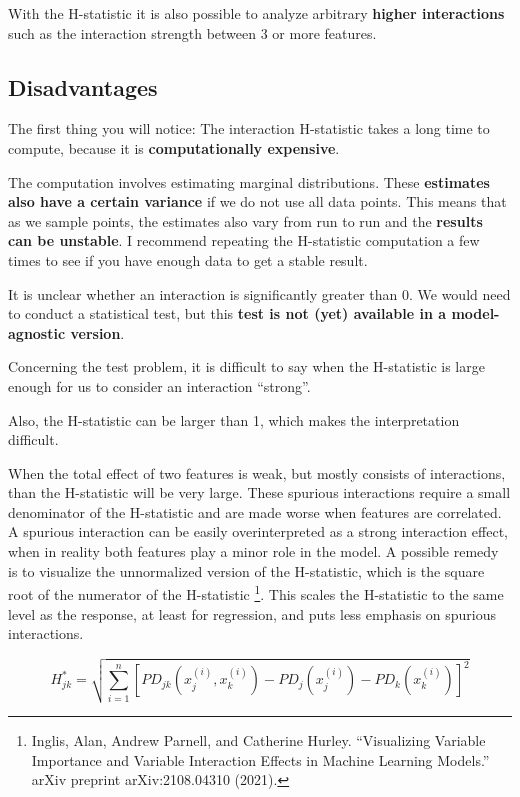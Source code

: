 \documentclass[
  11pt,
]{scrbook}
\begin{document}
With the H-statistic it is also possible to analyze arbitrary \textbf{higher interactions} such as the interaction strength between 3 or more features.

\hypertarget{disadvantages-7}{%
\subsection{Disadvantages}\label{disadvantages-7}}

The first thing you will notice:
The interaction H-statistic takes a long time to compute, because it is \textbf{computationally expensive}.

The computation involves estimating marginal distributions.
These \textbf{estimates also have a certain variance} if we do not use all data points.
This means that as we sample points, the estimates also vary from run to run and the \textbf{results can be unstable}.
I recommend repeating the H-statistic computation a few times to see if you have enough data to get a stable result.

It is unclear whether an interaction is significantly greater than 0.
We would need to conduct a statistical test, but this \textbf{test is not (yet) available in a model-agnostic version}.

Concerning the test problem, it is difficult to say when the H-statistic is large enough for us to consider an interaction ``strong''.

Also, the H-statistic can be larger than 1, which makes the interpretation difficult.

When the total effect of two features is weak, but mostly consists of interactions, than the H-statistic will be very large.
These spurious interactions require a small denominator of the H-statistic and are made worse when features are correlated.
A spurious interaction can be easily overinterpreted as a strong interaction effect, when in reality both features play a minor role in the model.
A possible remedy is to visualize the unnormalized version of the H-statistic, which is the square root of the numerator of the H-statistic \footnote{Inglis, Alan, Andrew Parnell, and Catherine Hurley. ``Visualizing Variable Importance and Variable Interaction Effects in Machine Learning Models.'' arXiv preprint arXiv:2108.04310 (2021).}.
This scales the H-statistic to the same level as the response, at least for regression, and puts less emphasis on spurious interactions.

\[H^{*}_{jk} = \sqrt{\sum_{i=1}^n\left[PD_{jk}(x_{j}^{(i)},x_k^{(i)})-PD_j(x_j^{(i)}) - PD_k(x_{k}^{(i)})\right]^2}\]
\end{document}
